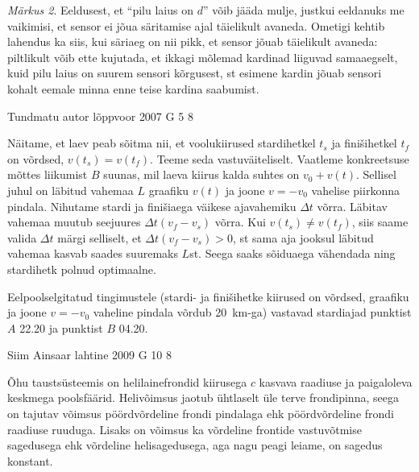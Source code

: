 \documentclass[11pt]{article}
\begin{document}
{{\emph{Märkus 2}. Eeldusest, et \enquote{pilu laius on $d$} võib jääda mulje, justkui eeldanuks me
vaikimisi, et sensor ei jõua säritamise ajal täielikult avaneda. Ometigi kehtib lahendus
ka siis, kui säriaeg on nii pikk, et sensor jõuab täielikult avaneda: piltlikult võib
ette kujutada, et ikkagi mõlemad kardinad liiguvad samaaegselt, kuid pilu laius on
suurem sensori kõrgusest, st esimene kardin jõuab sensori kohalt eemale minna enne
teise kardina saabumist.
\fi
}
\newpage

{Tundmatu autor} %
{lõppvoor} %
{2007} %
{G 5} %
{8} %
{

\ifSolution
Näitame, et laev peab sõitma nii, et voolukiirused stardihetkel $t_s$ ja finišihetkel $t_f$ on võrdsed, $v(t_s) = v(t_f)$. Teeme seda vastuväiteliselt. Vaatleme konkreetsuse mõttes liikumist $B$ suunas, mil laeva kiirus kalda suhtes on $v_0 + v(t)$. Sellisel juhul on läbitud vahemaa $L$ graafiku $v(t)$ ja joone $v = -v_0$ vahelise piirkonna pindala. Nihutame stardi ja finišiaega väikese ajavahemiku $\Delta t$ võrra. Läbitav vahemaa muutub seejuures $\Delta t(v_f - v_s)$ võrra. Kui $v(t_s) \neq v(t_f)$, siis saame valida $\Delta t$ märgi selliselt, et $\Delta t(v_f - v_s) > 0$, st sama aja jooksul läbitud vahemaa kasvab saades suuremaks $L$st. Seega saaks sõiduaega vähendada ning stardihetk polnud optimaalne.

Eelpoolselgitatud tingimustele (stardi- ja finišihetke kiirused on võrdsed, graafiku ja joone $v = -v_0$ vaheline pindala võrdub \SI{20}{km}-ga) vastavad stardiajad punktist $A$ 22.20 ja punktist $B$ 04.20.
\fi
}

{Siim Ainsaar} %
{lahtine} %
{2009} %
{G 10} %
{8} %
{

\ifSolution
Õhu taustsüsteemis on helilainefrondid kiirusega $c$ kasvava raadiuse ja paigaloleva keskmega poolsfäärid. Helivõimsus jaotub ühtlaselt üle terve frondipinna, seega on tajutav võimsus pöördvõrdeline frondi pindalaga ehk pöördvõrdeline frondi raadiuse ruuduga. Lisaks on võimsus ka võrdeline frontide vastuvõtmise sagedusega ehk võrdeline helisagedusega, aga nagu peagi leiame, on sagedus konstant.

}}
\end{document}
